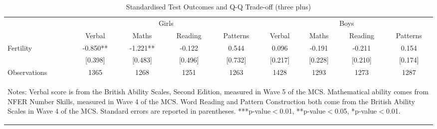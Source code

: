 \begin{table}[htbp]\centering
\def\sym#1{\ifmmode^{#1}\else\(^{#1}\)\fi}
\caption{Standardised Test Outcomes and Q-Q Trade-off (three plus)}
\begin{tabular}{l*{8}{c}}
\toprule
                    &\multicolumn{4}{c}{Girls}                                      &\multicolumn{4}{c}{Boys}                                       \\\cmidrule(lr){2-5}\cmidrule(lr){6-9}
                    &      Verbal   &       Maths   &     Reading   &    Patterns   &      Verbal   &       Maths   &     Reading   &    Patterns   \\
\midrule
Fertility           &      -0.850** &      -1.221** &      -0.122   &       0.544   &       0.096   &      -0.191   &      -0.211   &       0.154   \\
                    &     [0.398]   &     [0.483]   &     [0.496]   &     [0.732]   &     [0.217]   &     [0.228]   &     [0.210]   &     [0.174]   \\
\midrule
Observations        &        1365   &        1268   &        1251   &        1263   &        1428   &        1293   &        1273   &        1287   \\
\bottomrule\multicolumn{9}{p{15.8cm}}{\begin{footnotesize}
Notes: Verbal score is from the British Ability Scales,   
Second Edition, measured in Wave 5 of the MCS.            
Mathematical ability comes from NFER Number Skills,       
measured in Wave 4 of the MCS. Word Reading and Pattern   
Construction both come from the British Ability Scales in 
Wave 4 of the MCS. Standard errors are reported in parentheses. ***p-value$<$0.01, **p-value$<$0.05, *p-value$<$0.01.                                
\end{footnotesize}}\end{tabular}\end{table}